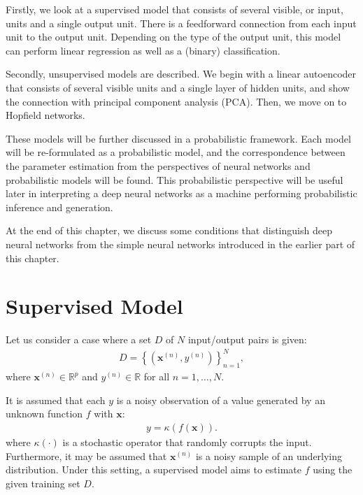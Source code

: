 \documentclass{now}
\newcommand{\vect}[1]{\mathbf{#1}}
\newcommand{\vx}[0]{\vect{x}}
\newcommand{\RR}[0]{\mathbb{R}}
\begin{document}
Firstly, we look at a supervised model that consists of
several visible, or input, units and a single output
unit. There is a feedforward connection from each input unit to
the output unit.  Depending on the type of the output unit,
this model can perform linear regression as well as a
(binary) classification.

Secondly, unsupervised models are described. We begin with a
linear autoencoder that consists of several visible units
and a single layer of hidden units, and show the connection
with principal component analysis (PCA). Then, we move on to
Hopfield networks.

These models will be further discussed in a probabilistic
framework.  Each model will be re-formulated as a
probabilistic model, and the correspondence between the
parameter estimation from the perspectives of neural
networks and probabilistic models will be found. This
probabilistic perspective will be useful later in
interpreting a deep neural networks as a machine
performing probabilistic inference and generation.

At the end of this chapter, we 
discuss some conditions
that distinguish deep neural networks from the simple neural
networks introduced in the earlier part of this chapter.

\section{Supervised Model}
\label{sec:supervised_model}

Let us consider a case where a set $D$ of $N$ input/output
pairs is given:
\begin{align}
    \label{eq:set_disc}
D=\left\{ \left( \vx^{(n)}, y^{(n)}
\right) \right\}_{n=1}^N,
\end{align}
where $\vx^{(n)} \in \RR^p$ and $y^{(n)} \in \RR$ for all
$n=1,\dots,N$.

It is assumed that each $y$ is a noisy observation of a
value generated by an unknown function $f$ with $\vx$:
\begin{align}
    \label{eq:linreg_gen}
    y = \kappa(f(\vx)).
\end{align}
where $\kappa(\cdot)$ is a stochastic operator that randomly
corrupts the input. 
Furthermore, it may be
assumed that $\vx^{(n)}$ is a noisy sample of an underlying
distribution.  Under this setting, a supervised model aims
to estimate $f$ using the given training set $D$.
\end{document}
